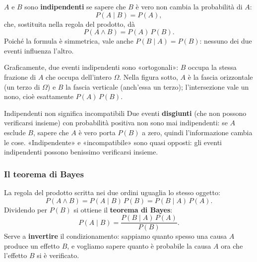 \documentclass[12pt]{extarticle}
\begin{document}
\noindent $A$ e $B$ sono \textbf{indipendenti} se sapere che $B$ è vero non cambia la probabilità di $A$:
\[
P(A \mid B) = P(A),
\]
che, sostituita nella regola del prodotto, dà
\[
P(A \land B) = P(A)\,P(B).
\]
Poiché la formula è simmetrica, vale anche $P(B \mid A)=P(B)$: nessuno dei due eventi influenza l'altro.

\noindent Graficamente, due eventi indipendenti sono «ortogonali»: $B$ occupa la stessa frazione di $A$ che occupa dell'intero $\Omega$. Nella figura sotto, $A$ è la fascia orizzontale (un terzo di $\Omega$) e $B$ la fascia verticale (anch'essa un terzo); l'intersezione vale un nono, cioè esattamente $P(A)\,P(B)$.
\begin{center}
\end{center}

\begin{attenzionebox}{Indipendenti non significa incompatibili}
Due eventi \textbf{disgiunti} (che non possono verificarsi insieme) con probabilità positiva non sono mai indipendenti: se $A$ esclude $B$, sapere che $A$ è vero porta $P(B)$ a zero, quindi l'informazione cambia le cose. «Indipendente» e «incompatibile» sono quasi opposti: gli eventi indipendenti possono benissimo verificarsi insieme.
\end{attenzionebox}

\subsubsection{Il teorema di Bayes}

\noindent La regola del prodotto scritta nei due ordini uguaglia lo stesso oggetto:
\[
P(A \land B) = P(A \mid B)\,P(B) = P(B \mid A)\,P(A).
\]
Dividendo per $P(B)$ si ottiene il \textbf{teorema di Bayes}:
\[
P(A \mid B) = \frac{P(B \mid A)\,P(A)}{P(B)}.
\]
Serve a \textbf{invertire} il condizionamento: sappiamo quanto spesso una causa $A$ produce un effetto $B$, e vogliamo sapere quanto è probabile la causa $A$ ora che l'effetto $B$ si è verificato.
\end{document}
